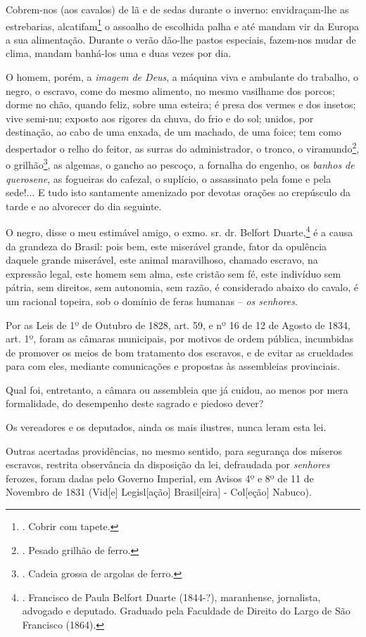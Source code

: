 Cobrem-nos (aos cavalos) de lã e de sedas durante o inverno:
envidraçam-lhe as estrebarias, alcatifam\footnote{. Cobrir com tapete.}
o assoalho de escolhida palha e até mandam vir da Europa a sua
alimentação. Durante o verão dão-lhe pastos especiais, fazem-nos mudar
de clima, mandam banhá-los uma e duas vezes por dia.

O homem, porém, a \emph{imagem de Deus}, a máquina viva e ambulante do
trabalho, o negro, o escravo, come do mesmo alimento, no mesmo vasilhame
dos porcos; dorme no chão, quando feliz, sobre uma esteira; é presa dos
vermes e dos insetos; vive semi-nu; exposto aos rigores da chuva, do
frio e do sol; unidos, por destinação, ao cabo de uma enxada, de um
machado, de uma foice; tem como despertador o relho do feitor, as surras
do administrador, o tronco, o viramundo\footnote{. Pesado grilhão de
  ferro.}, o grilhão\footnote{. Cadeia grossa de argolas de ferro.}, as
algemas, o gancho ao pescoço, a fornalha do engenho, os \emph{banhos de
querosene}, as fogueiras do cafezal, o suplício, o assassinato pela fome
e pela sede!... E tudo isto santamente amenizado por devotas orações ao
crepúsculo da tarde e ao alvorecer do dia seguinte.

O negro, disse o meu estimável amigo, o exmo. sr. dr. Belfort
Duarte,\footnote{. Francisco de Paula Belfort Duarte (1844-?),
  maranhense, jornalista, advogado e deputado. Graduado pela Faculdade
  de Direito do Largo de São Francisco (1864).} é a causa da grandeza do
Brasil: pois bem, este miserável grande, fator da opulência daquele
grande miserável, este animal maravilhoso, chamado escravo, na expressão
legal, este homem sem alma, este cristão sem fé, este indivíduo sem
pátria, sem direitos, sem autonomia, sem razão, é considerado abaixo do
cavalo, é um racional topeira, sob o domínio de feras humanas --
\emph{os senhores}.

Por as Leis de 1º de Outubro de 1828, art. 59, e nº 16 de 12 de Agosto
de 1834, art. 1º, foram as câmaras municipais, por motivos de ordem
pública, incumbidas de promover os meios de bom tratamento dos escravos,
e de evitar as crueldades para com eles, mediante comunicações e
propostas às assembleias provinciais.

Qual foi, entretanto, a câmara ou assembleia que já cuidou, ao menos por
mera formalidade, do desempenho deste sagrado e piedoso dever?

Os vereadores e os deputados, ainda os mais ilustres, nunca leram esta
lei.

Outras acertadas providências, no mesmo sentido, para segurança dos
míseros escravos, restrita observância da disposição da lei, defraudada
por \emph{senhores} ferozes, foram dadas pelo Governo Imperial, em
Avisos 4º e 8º de 11 de Novembro de 1831 (Vid{[}e{]} Legisl{[}ação{]}
Brasil{[}eira{]} - Col{[}eção{]} Nabuco).

